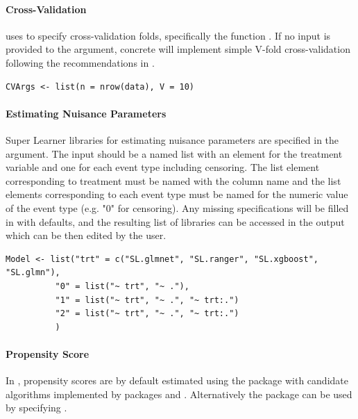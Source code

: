 \documentclass{report}
\newcommand{\1}{\ensuremath{\mathbf{1}}}
\begin{document}
\paragraph{Cross-Validation}
\label{CV}
 uses  to specify cross-validation folds, specifically the function
. If no input is provided to the  argument, concrete will implement simple V-fold cross-validation following the recommendations in \cite{phillips_practical_2022}.

\begin{lstlisting}
CVArgs <- list(n = nrow(data), V = 10)
\end{lstlisting}

\paragraph{Estimating Nuisance Parameters}
\label{NuisanceEstimation}
Super Learner libraries for estimating nuisance parameters are specified in the  argument. The input should be a named list with an element for the treatment variable and one for each event type including censoring. The list element corresponding to treatment must be named with the column name and the list elements corresponding to each event type must be named for the numeric value of the event type (e.g. "0" for censoring). Any missing specifications will be filled in with defaults, and the resulting list of libraries can be accessed in the output  which can be then edited by the user.

\begin{lstlisting}
Model <- list("trt" = c("SL.glmnet", "SL.ranger", "SL.xgboost", "SL.glmn"),
	      "0" = list("~ trt", "~ ."),
	      "1" = list("~ trt", "~ .", "~ trt:.")
	      "2" = list("~ trt", "~ .", "~ trt:.")
	      )
\end{lstlisting}

\paragraph{Propensity Score}
\label{PropScore}
In , propensity scores are by default estimated using the 
package  with candidate algorithms  implemented by packages  and . Alternatively the  package can be used by specifying .
\end{document}
